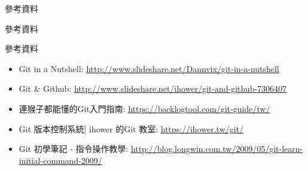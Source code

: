\documentclass[pdf,16pt]{beamer}
\begin{document}
   \begin{section}{參考資料}
    \begin{subsection}{參考資料}
      \begin{frame}{參考資料}
        \begin{itemize}
          \item Git in a Nutshell: \url{http://www.slideshare.net/Dannvix/git-in-a-nutshell}
          \item Git \& Github: \url{http://www.slideshare.net/ihower/git-and-github-7306407}
          \item 連猴子都能懂的Git入門指南: \url{https://backlogtool.com/git-guide/tw/}
          \item Git 版本控制系統| ihower 的Git 教室: \url{https://ihower.tw/git/}
          \item Git 初學筆記 - 指令操作教學: \url{http://blog.longwin.com.tw/2009/05/git-learn-initial-command-2009/}
        \end{itemize}
      \end{frame}
     \end{subsection}
   \end{section}
\end{document}
